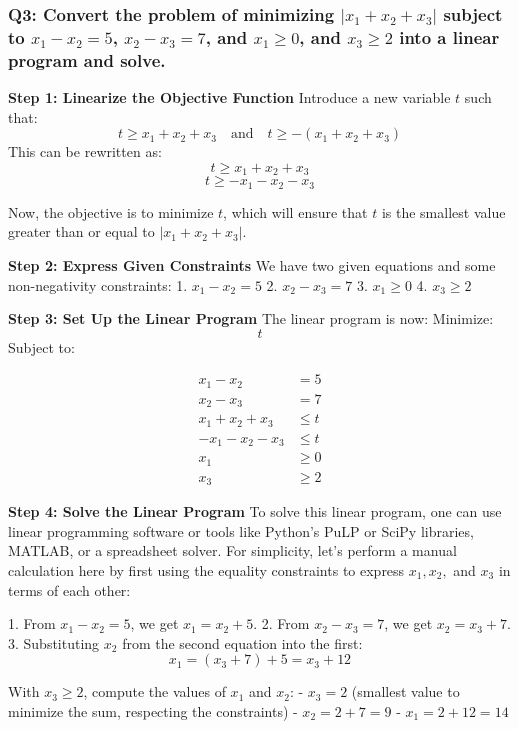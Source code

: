\documentclass[8pt]{article}
\begin{document}
{\subsubsection*{Q3: Convert the problem of minimizing \(|x_1 + x_2 + x_3|\) subject to \(x_1 - x_2 = 5\), \(x_2 - x_3 = 7\), and \(x_1 \geq 0\), and \(x_3 \geq 2\) into a linear program and solve.}

\textbf{Step 1: Linearize the Objective Function}
Introduce a new variable \( t \) such that:
\[
t \geq x_1 + x_2 + x_3 \quad \text{and} \quad t \geq -(x_1 + x_2 + x_3)
\]
This can be rewritten as:
\[
t \geq x_1 + x_2 + x_3
\]
\[
t \geq -x_1 - x_2 - x_3
\]

Now, the objective is to minimize \( t \), which will ensure that \( t \) is the smallest value greater than or equal to \( |x_1 + x_2 + x_3| \).

\textbf{Step 2: Express Given Constraints}
We have two given equations and some non-negativity constraints:
1. \( x_1 - x_2 = 5 \)
2. \( x_2 - x_3 = 7 \)
3. \( x_1 \geq 0 \)
4. \( x_3 \geq 2 \)

\textbf{Step 3: Set Up the Linear Program}
The linear program is now:
Minimize:
\[
t
\]
Subject to:

\begin{align*}
x_1 - x_2 &= 5 \\
x_2 - x_3 &= 7 \\
x_1 + x_2 + x_3 &\leq t \\
-x_1 - x_2 - x_3 &\leq t \\
x_1 &\geq 0 \\
x_3 &\geq 2
\end{align*}

\textbf{Step 4: Solve the Linear Program}
To solve this linear program, one can use linear programming software or tools like Python’s PuLP or SciPy libraries, MATLAB, or a spreadsheet solver. For simplicity, let’s perform a manual calculation here by first using the equality constraints to express \( x_1, x_2, \) and \( x_3 \) in terms of each other:

1. From \( x_1 - x_2 = 5 \), we get \( x_1 = x_2 + 5 \).
2. From \( x_2 - x_3 = 7 \), we get \( x_2 = x_3 + 7 \).
3. Substituting \( x_2 \) from the second equation into the first:
   \[
   x_1 = (x_3 + 7) + 5 = x_3 + 12
   \]

With \( x_3 \geq 2 \), compute the values of \( x_1 \) and \( x_2 \):
- \( x_3 = 2 \) (smallest value to minimize the sum, respecting the constraints)
- \( x_2 = 2 + 7 = 9 \)
- \( x_1 = 2 + 12 = 14 \)

}
\end{document}
